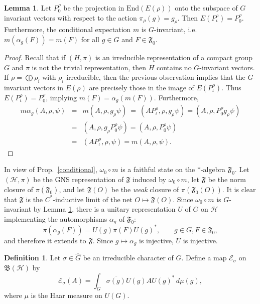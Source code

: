 \documentclass[12pt]{article}
\newcommand{\alg}[1]{\mathfrak{#1}}
\newcommand{\bh}{\mathfrak{B}(\mathcal{H})}
\theoremstyle{definition}
\newtheorem{lemma}[thm]{Lemma}
\theoremstyle{definition}
\newtheorem{defn}[thm]{Definition}
\theoremstyle{remark}
\def\2#1{{\mathcal #1}}
\def\4#1{{\mathscr #1}}
\def\al#1{{\mathfrak #1}}
\def\a{\alpha} \def\b{\beta} \def\g{\gamma} \def\d{\delta}
\def\om{\omega} \def\Om{\Omega} \def\dd{\partial} \def\D{\Delta}
\newcommand{\End}{\mathrm{End}}
\begin{document}
\begin{lemma} Let $P_0^{\rho}$ be the projection in $\End (E(\rho ))$ onto the
  subspace of $G$ invariant vectors with respect to the action $\pi _\rho
  (g)=g_\rho$.  Then $E(P^{\rho }_{\iota})=P_0^{\rho}$.  Furthermore, the conditional
  expectation $m$ is $G$-invariant, i.e.\ $m(\a _g(F))=m(F)$ for all $g\in G$ and
  $F\in \alg{F}_0$.  \label{invariant} \end{lemma}

\begin{proof} Recall that if $(H, \pi )$ is an irreducible representation of a
  compact group $G$ and $\pi$ is not the trivial representation, then $H$ contains no
  $G$-invariant vectors.  If $\rho =\bigoplus \rho _i$ with $\rho _i$ irreducible,
  then the previous observation implies that the $G$-invariant vectors in $E(\rho )$
  are precisely those in the image of $E(P_{\iota}^{\rho})$.  Thus
  $E(P_{\iota}^{\rho})=P_0^{\rho}$, implying $m(F)=\a _g(m(F))$.  Furthermore,
  \begin{eqnarray*} m\alpha _g(A,\rho ,\psi ) &=& m(A,\rho ,g_\rho \psi )\:=\:
    (AP_{\iota}^{\rho},\rho ,g_\rho \psi ) =(A,\rho ,P_{0}^{\rho}g_\rho \psi  ) \\
    &=& (A,\rho ,g_\rho P_{0}^{\rho}\psi ) = (A,\rho ,P_0^{\rho}\psi ) \\ &=&
    (AP_{\iota}^{\rho},\rho ,\psi ) = m(A,\rho ,\psi ).\end{eqnarray*}
\end{proof}

In view of Prop.\ \ref{conditional}, $\om _0\circ m$ is
a faithful state on the $*$-algebra $\al F_0$.  Let
$(\2H ,\pi )$ be the GNS representation of $\al F$
induced by $\om _0\circ m$, let $\al F$ be the norm
closure of $\pi (\al F_0)$, and let $\al F(O)$ be the
\emph{weak} closure of $\pi (\al F_0(O))$.  It is clear
that $\al F$ is the $C^*$-inductive limit of the net
$O\mapsto \al F(O)$.  Since $\om _0\circ m$ is
$G$-invariant by Lemma \ref{invariant}, there is a
unitary representation $U$ of $G$ on $\2H$ implementing
the automorphisms $\a _g$ of $\alg F_0$:
\[ \pi (\a _g(F))= U(g)\pi (F)U(g)^* ,\qquad g\in
G,F\in \alg{F}_0 ,\] and therefore it extends to $\al
F$.  Since $g\mapsto \a _g$ is injective, $U$ is
injective.


\begin{defn} \label{cond-exp}
Let $\sigma \in \hat{G}$ be an irreducible character of $G$.  Define a
  map $\4E _{\sigma}$ on $\bh$ by
\[ \4E _{\sigma}(A)=\int _{G}\overline{\sigma (g)}U(g)AU(g)^{*}\, d\mu (g) ,\] where
$\mu$ is the Haar measure on $U(G)$.  \end{defn}
\end{document}
